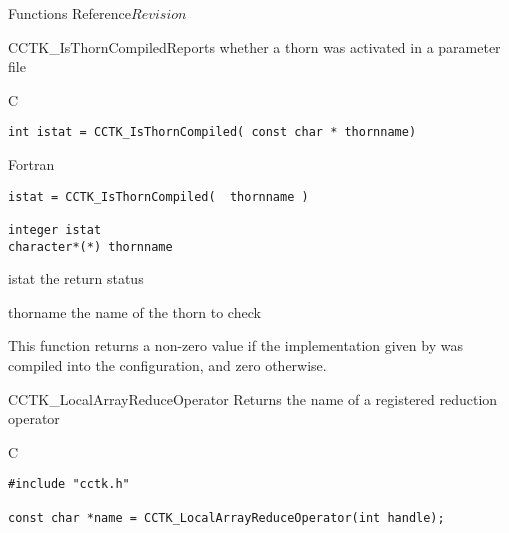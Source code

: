 \begin{cactuspart}{ Functions Reference}{}{$Revision$}
\begin{FunctionDescription}{CCTK\_IsThornCompiled}{Reports whether a thorn was activated in a parameter file}
\label{CCTK-IsThornCompiled}
\begin{SynopsisSection}
\begin{Synopsis}{C}
\begin{verbatim}int istat = CCTK_IsThornCompiled( const char * thornname)\end{verbatim}
\end{Synopsis}
\begin{Synopsis}{Fortran}
\begin{verbatim}istat = CCTK_IsThornCompiled(  thornname )

integer istat
character*(*) thornname\end{verbatim}
\end{Synopsis}
\end{SynopsisSection}
\begin{ParameterSection}
\begin{Parameter}{istat}
the return status
\end{Parameter}
\begin{Parameter}{thorname}
the name of the thorn to check
\end{Parameter}
\end{ParameterSection}
\begin{Discussion}
This function returns a non-zero value if the implementation given by
 was compiled into the configuration, and zero
otherwise.
\end{Discussion}
\end{FunctionDescription}






\begin{FunctionDescription}{CCTK\_LocalArrayReduceOperator}
\label{CCTK-LocalArrayReduceOperator}
Returns the name of a registered reduction operator

\begin{SynopsisSection}
\begin{Synopsis}{C}
\begin{verbatim}
#include "cctk.h"

const char *name = CCTK_LocalArrayReduceOperator(int handle);
\end{verbatim}
\end{Synopsis}
\end{SynopsisSection}


\end{FunctionDescription}
\end{cactuspart}

